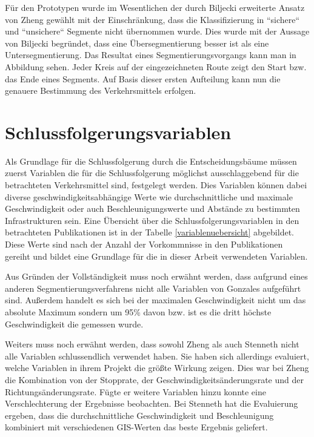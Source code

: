Für den Prototypen wurde im Wesentlichen der durch Biljecki erweiterte Ansatz von Zheng gewählt mit der Einschränkung, dass die Klassifizierung in ``sichere`` und ``unsichere`` Segmente nicht übernommen wurde. Dies wurde mit der Aussage von Biljecki begründet, dass eine Übersegmentierung besser ist als eine Untersegmentierung. Das Resultat eines Segmentierungsvorgangs kann man in Abbildung  sehen. Jeder Kreis auf der eingezeichneten Route zeigt den Start bzw. das Ende eines Segments. Auf Basis dieser ersten Aufteilung kann nun die genauere Bestimmung des Verkehrsmittels erfolgen.


\clearpage

\section{Schlussfolgerungsvariablen}
\label{schlussfolgerungsvariablen}
Als Grundlage für die Schlussfolgerung durch die Entscheidungsbäume müssen zuerst Variablen die für die Schlussfolgerung möglichst ausschlaggebend für die betrachteten Verkehrsmittel sind, festgelegt werden. Dies Variablen können dabei diverse geschwindigkeitsabhängige Werte wie durchschnittliche und maximale Geschwindigkeit oder auch Beschleunigungswerte und  Abstände zu bestimmten Infrastrukturen sein. Eine Übersicht über die Schlussfolgerungsvariablen in den betrachteten Publikationen ist in der Tabelle \ref{variablenuebersicht} abgebildet. Diese Werte sind nach der Anzahl der Vorkommnisse in den Publikationen gereiht und bildet eine Grundlage für die in dieser Arbeit verwendeten Variablen. 

Aus Gründen der Vollständigkeit muss noch erwähnt werden, dass aufgrund eines anderen Segmentierungsverfahrens nicht alle Variablen von Gonzales  \cite{gonzalez_automating_2010} aufgeführt sind. Außerdem handelt es sich bei der maximalen Geschwindigkeit nicht um das absolute Maximum sondern um 95\% davon bzw. ist es die dritt höchste Geschwindigkeit die gemessen wurde. 

Weiters muss noch erwähnt werden, dass sowohl Zheng  \cite{zheng_understanding_2010} als auch Stenneth \cite{stenneth_transportation_2011} nicht alle Variablen schlussendlich verwendet haben. Sie haben sich allerdings evaluiert, welche Variablen in ihrem Projekt die größte Wirkung zeigen. Dies war bei Zheng \cite{zheng_understanding_2010} die Kombination von der Stopprate, der Geschwindigkeitsänderungsrate und der Richtungsänderungsrate. Fügte er weitere Variablen hinzu konnte eine Verschlechterung der Ergebnisse beobachten. Bei Stenneth \cite{stenneth_transportation_2011} hat die Evaluierung ergeben, dass die durchschnittliche Geschwindigkeit und Beschleunigung kombiniert mit verschiedenen GIS-Werten das beste Ergebnis geliefert. 

